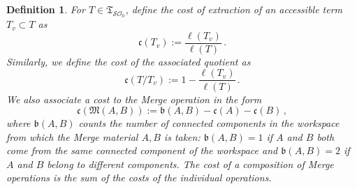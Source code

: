 \documentclass[12pt]{amsart}
\newtheorem{defn}[prop]{Definition}
\numberwithin{equation}{section}
\def\cO{{\mathcal O}}
\def\cS{{\mathcal S}}
\def\fM{{\mathfrak M}}
\def\fT{{\mathfrak T}}
\def\fc{{\mathfrak c}}
\def\fb{{\mathfrak b}}
\begin{document}
  \begin{defn}\label{costdef}
  For $T\in \fT_{\cS\cO_0}$, define the {\rm cost of
  extraction} of an accessible term $T_v \subset T$ as 
  \begin{equation}\label{costTv}
  \fc(T_v):= \frac{\ell(T_v)}{\ell(T)} \, .
  \end{equation}
  Similarly, we define the cost of the associated quotient as
   \begin{equation}\label{costTTv}
  \fc(T/T_v):= 1-\frac{\ell(T_v)}{\ell(T)} \, .
  \end{equation}
  We also associate a cost to the Merge operation in the form
  \begin{equation}\label{costM}
  \fc(\fM(A,B)):=\fb(A,B) - \fc(A)-\fc(B)\, ,
  \end{equation}
  where $\fb(A,B)$ counts the number of connected components in the workspace from which the
  Merge material $A,B$ is taken:  $\fb(A,B)=1$ if $A$ and $B$ both come from the same connected
  component of the workspace and $\fb(A,B)=2$ if $A$ and $B$ belong to different components.
  The cost of a composition of Merge operations is the sum of the costs of the individual operations.
  \end{defn}
  
\end{document}
